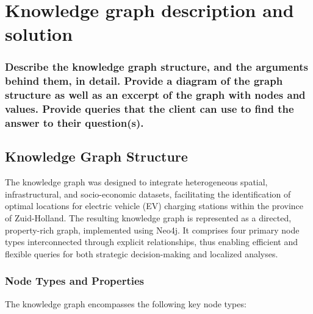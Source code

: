 \documentclass{article}
\newcommand{\question}[1]{#1}
\begin{document}


\section{Knowledge graph description and solution}
\question{\subsubsection*{Describe the knowledge graph structure, and the arguments behind them, in detail. Provide a diagram of the graph structure as well as an excerpt of the graph with nodes and values. Provide queries that the client can use to find the answer to their question(s).}}

\subsection{Knowledge Graph Structure}

The knowledge graph was designed to integrate heterogeneous spatial, infrastructural, and socio-economic datasets, facilitating the identification of optimal locations for electric vehicle (EV) charging stations within the province of Zuid-Holland. The resulting knowledge graph is represented as a directed, property-rich graph, implemented using Neo4j. It comprises four primary node types interconnected through explicit relationships, thus enabling efficient and flexible queries for both strategic decision-making and localized analyses.

\subsubsection{Node Types and Properties}

The knowledge graph encompasses the following key node types:
\end{document}
